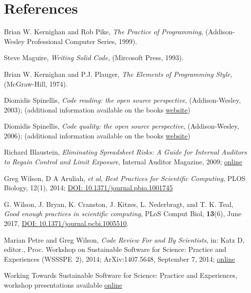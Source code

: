 \section{References}

\begingroup
\renewcommand{\section}[2]{}%

\begin{thebibliography}{99}
 Brian W. Kernighan and Rob Pike, \textit{The Practice of Programming}, (Addison-Wesley Professional Computer Series, 1999).

 Steve Maguire, \textit{Writing Solid Code}, (Mircosoft Press, 1993).
 
 Brian W. Kernighan and P.J. Plauger, \textit{The Elements of Programming Style}, (McGraw-Hill, 1974).

 Diomidis Spinellis, \textit{Code reading: the open source perspective}, (Addison-Wesley, 2003); (additional information available on the books \href{https://www.spinellis.gr/codereading/}{website})

 Diomidis Spinellis, \textit{Code quality: the open source perspective}, (Addison-Wesley, 2006); (additional information available on the books \href{https://www.spinellis.gr/codequality/}{website})


 Richard Blaustein, \textit{Eliminating Spreadsheet Risks: A Guide for Internal Auditors to Regain Control and Limit Exposure}, Internal Auditor Magazine, 2009; \href{http://www.analyticsolutions.com/index_files/page0017.htm}{online}

 Greg Wilson, D A Aruliah, \textit{et al}, \textit{Best Practices for Scientific Computing}, PLOS Biology, 12(1), 2014; \href{http://journals.plos.org/plosbiology/article?id=10.1371/journal.pbio.1001745}{DOI: 10.1371/journal.pbio.1001745}

G. Wilson, J. Bryan, K. Cranston, J. Kitzes, L. Nederbragt, and T. K. Teal, \textit{Good enough practices in scientific computing}, PLoS Comput Biol, \textbf{13}(6), June 2017, \href{https://journals.plos.org/ploscompbiol/article?id=10.1371/journal.pcbi.1005510}{DOI: 10.1371/journal.pcbi.1005510}.

 Marian Petre and Greg Wilson, \textit{Code Review For and By Scientists}, in: Katz D, editor., Proc. Workshop on Sustainable Software for Science: Practice and Experiences (WSSSPE~2), 2014; 
ArXiv:1407.5648, September 7, 2014; \href{http://arxiv.org/abs/1407.5648}{online}

 Working Towards Sustainable Software for Science: Practice and Experiences, workshop presentations available \href{http://wssspe.researchcomputing.org.uk/proceedings}{online}
\end{thebibliography}
\endgroup